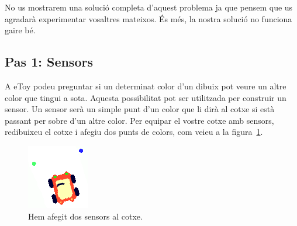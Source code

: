 No us mostrarem una solució completa d'aquest problema ja que pensem que us agradarà experimentar vosaltres mateixos. És més, la nostra solució no funciona gaire bé. 

\subsection{Pas 1: Sensors}
A eToy podeu preguntar si un determinat color d'un dibuix pot veure un altre color que tingui a sota. Aquesta possibilitat pot ser utilitzada per construir un sensor. Un sensor serà un simple punt d'un color que li dirà al cotxe si està passant per sobre d'un altre color. Per equipar el vostre cotxe amb sensors, redibuixeu el cotxe i afegiu dos punts de colors, com veieu a la figura~\ref{fig2439}.
\begin{figure}[h!]
\begin{center}
\includegraphics[scale=0.8]{Imatges/figura24-39}
\end{center}
\caption{Hem afegit dos sensors al cotxe.}
\label{fig2439}
\end{figure}

